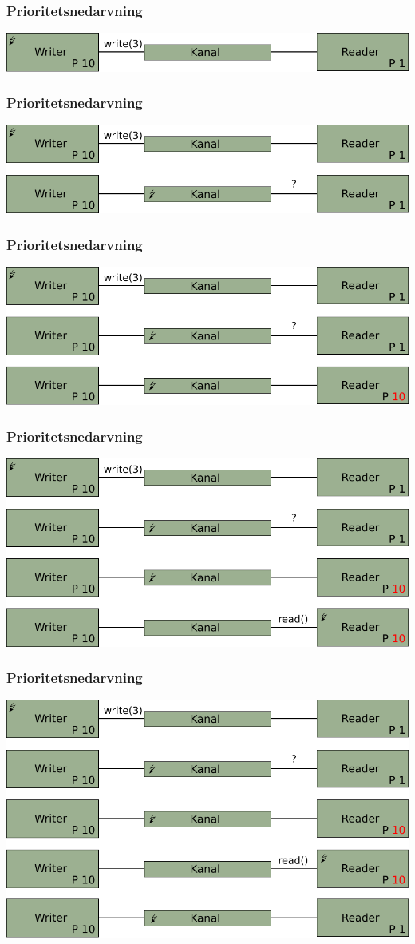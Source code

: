 \documentclass[12pt]{beamer}
\begin{document}
\begin{frame}
  \frametitle{Prioritetsnedarvning}
\includegraphics[scale=0.7]{nedarvning} 
\end{frame}
\begin{frame}
  \frametitle{Prioritetsnedarvning}
\includegraphics[scale=0.7]{nedarvning2} 
\end{frame}
\begin{frame}
  \frametitle{Prioritetsnedarvning}
\includegraphics[scale=0.7]{nedarvning3} 
\end{frame}
\begin{frame}
  \frametitle{Prioritetsnedarvning}
\includegraphics[scale=0.7]{nedarvning4} 
\end{frame}
\begin{frame}
  \frametitle{Prioritetsnedarvning}
\includegraphics[scale=0.7]{nedarvning5} 
\end{frame}
\end{document}
